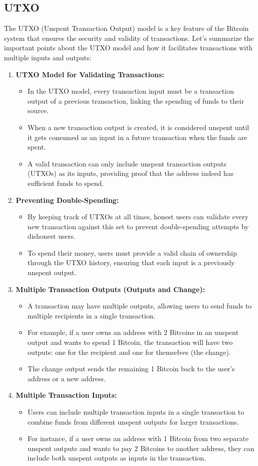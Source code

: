 \subsection{UTXO}
The UTXO (Unspent Transaction Output) model is a key feature of the Bitcoin system that ensures the security and validity of transactions. Let's summarize the important points about the UTXO model and how it facilitates transactions with multiple inputs and outputs:
\begin{enumerate}
	\item \textbf{UTXO Model for Validating Transactions:} 
	\begin{itemize}
		\item In the UTXO model, every transaction input must be a transaction output of a previous transaction, linking the spending of funds to their source.
		\item When a new transaction output is created, it is considered unspent until it gets consumed as an input in a future transaction when the funds are spent.
		\item A valid transaction can only include unspent transaction outputs (UTXOs) as its inputs, providing proof that the address indeed has sufficient funds to spend.
	\end{itemize}
	\item \textbf{Preventing Double-Spending:}
	\begin{itemize}
		\item By keeping track of UTXOs at all times, honest users can validate every new transaction against this set to prevent double-spending attempts by dishonest users.
		\item To spend their money, users must provide a valid chain of ownership through the UTXO history, ensuring that each input is a previously unspent output.
	\end{itemize}
	\item \textbf{Multiple Transaction Outputs (Outputs and Change):}
	\begin{itemize}
		\item A transaction may have multiple outputs, allowing users to send funds to multiple recipients in a single transaction.
		\item For example, if a user owns an address with 2 Bitcoins in an unspent output and wants to spend 1 Bitcoin, the transaction will have two outputs: one for the recipient and one for themselves (the change).
		\item The change output sends the remaining 1 Bitcoin back to the user's address or a new address.
	\end{itemize}
	\item \textbf{Multiple Transaction Inputs:}
	\begin{itemize}
		\item Users can include multiple transaction inputs in a single transaction to combine funds from different unspent outputs for larger transactions.
		\item For instance, if a user owns an address with 1 Bitcoin from two separate unspent outputs and wants to pay 2 Bitcoins to another address, they can include both unspent outputs as inputs in the transaction.
	\end{itemize}
\end{enumerate}
